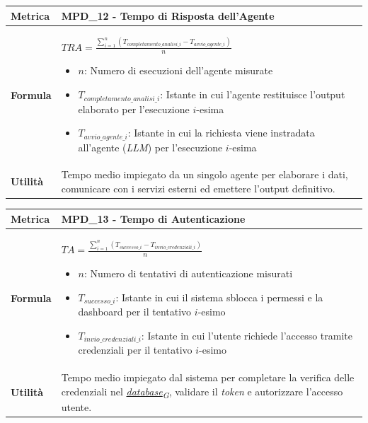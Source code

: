 \documentclass[12pt, a4paper]{article}
\newcommand{\urlglossario}{https://skynetunigroup.github.io/Code_Guardian/Documentazione/RTB/glossario_v1.0.0.pdf} %
\newcommand{\glo}[2]{\href{\urlglossario\#nameddest=#2}{#1\textsubscript{G}}}
\begin{document}
\begin{table}[H]
\centering
\renewcommand{\arraystretch}{1.5}
\begin{tabular}{|l|p{12cm}|}
\hline
\textbf{Metrica} & MPD\_12 - Tempo di Risposta dell'Agente \\ \hline
\textbf{Formula} & $TRA = \frac{\sum_{i=1}^{n} (T_{completamento\_analisi\_i} - T_{avvio\_agente\_i})}{n}$
\begin{itemize}
    \item $n$: Numero di esecuzioni dell'agente misurate
    \item $T_{completamento\_analisi\_i}$: Istante in cui l'agente restituisce l'output elaborato per l'esecuzione $i$-esima
    \item $T_{avvio\_agente\_i}$: Istante in cui la richiesta viene instradata all'agente (\textit{LLM}) per l'esecuzione $i$-esima
\end{itemize} \\ \hline
\textbf{Utilità} & Tempo medio impiegato da un singolo agente per elaborare i dati, comunicare con i servizi esterni ed emettere l'output definitivo. \\ \hline
\end{tabular}
\end{table}

\begin{table}[H]
\centering
\renewcommand{\arraystretch}{1.5}
\begin{tabular}{|l|p{12cm}|}
\hline
\textbf{Metrica} & MPD\_13 - Tempo di Autenticazione \\ \hline
\textbf{Formula} & $TA = \frac{\sum_{i=1}^{n} (T_{successo\_i} - T_{invio\_credenziali\_i})}{n}$
\begin{itemize}
    \item $n$: Numero di tentativi di autenticazione misurati
    \item $T_{successo\_i}$: Istante in cui il sistema sblocca i permessi e la dashboard per il tentativo $i$-esimo
    \item $T_{invio\_credenziali\_i}$: Istante in cui l'utente richiede l'accesso tramite credenziali per il tentativo $i$-esimo
\end{itemize} \\ \hline
\textbf{Utilità} & Tempo medio impiegato dal sistema per completare la verifica delle credenziali nel \textit{\glo{database}{database}}, validare il \textit{token} e autorizzare l'accesso utente. \\ \hline
\end{tabular}
\end{table}
\end{document}
